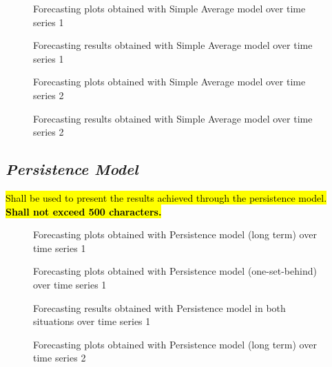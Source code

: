 \documentclass[10pt]{extarticle}
\newcommand{\ctext}[3][RGB]{%
  \begingroup
  \definecolor{hlcolor}{#1}{#2}\sethlcolor{hlcolor}%
  \hl{#3}%
  \endgroup
}
\begin{document}
\begin{figure}[H]
\caption{Forecasting plots obtained with Simple Average model over time series 1}
\end{figure}

\begin{figure}[H]
\caption{Forecasting results obtained with Simple Average model over time series 1}
\end{figure}

\begin{figure}[H]
\caption{Forecasting plots obtained with Simple Average model over time series 2}
\end{figure}

\begin{figure}[H]
\caption{Forecasting results obtained with Simple Average model over time series 2}
\end{figure}

\subsection*{\textit{Persistence Model}}
\ctext[RGB]{190,190,190}{Shall be used to present the results achieved through the persistence model.  \textbf{Shall not exceed 500 characters.}}

\begin{figure}[H]
\caption{Forecasting plots obtained with Persistence model (long term) over time series 1}
\end{figure}

\begin{figure}[H]
\caption{Forecasting plots obtained with Persistence model (one-set-behind) over time series 1}
\end{figure}

\begin{figure}[H]
\caption{Forecasting results obtained with Persistence model in both situations over time series 1}
\end{figure}

\begin{figure}[H]
\caption{Forecasting plots obtained with Persistence model (long term) over time series 2}
\end{figure}
\end{document}
